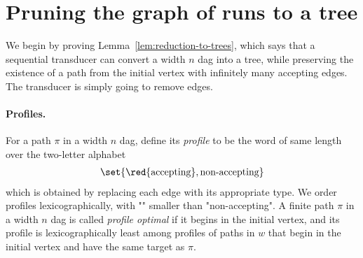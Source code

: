 \section{Pruning the graph of runs to a tree}
\label{sec:reduction-to-trees}
We begin by proving Lemma~\ref{lem:reduction-to-trees}, which says that a sequential transducer can convert a width $n$ dag into a tree, while preserving  the  existence of a path from the initial vertex with infinitely many accepting edges. The transducer is simply going to remove edges.






\paragraph*{Profiles.} For a path $\pi$ in a  width $n$ dag, define its \emph{profile} to be the word of same length over the two-letter alphabet 
\begin{align*}
	\set{\text{\red{accepting}}, \text{non-accepting}}
\end{align*}
which is obtained by replacing each edge with its appropriate type. We  order profiles lexicographically, with ""  smaller than "non-accepting". 
A finite path $\pi$ in a width $n$ dag is called \emph{profile optimal} if it begins in the initial vertex, and its profile is lexicographically least among profiles of  paths in $w$ that begin in the initial vertex and have the same target as $\pi$.

